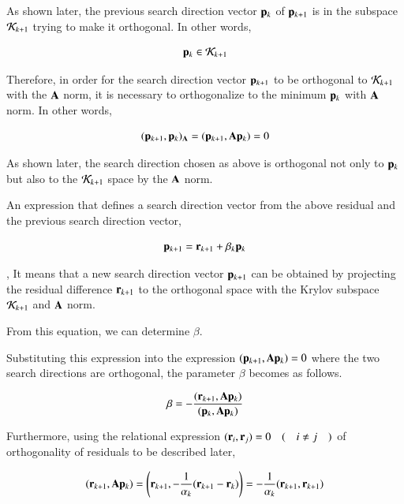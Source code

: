 As shown later, the previous search direction vector $\mathbf{p}_k$ of $\mathbf{p}_{k+1}$ is in the subspace ${\cal K}_{k+1}$ trying to make it orthogonal. In other words,

\begin{equation}
\mathbf{p}_k\in{\cal K}_{k+1}
\end{equation}


Therefore, in order for the search direction vector $\mathbf{p}_{k+1}$ to be orthogonal to ${\cal K}_{k+1}$ with the $\mathbf{A}$ norm, it is necessary to orthogonalize to the minimum $\mathbf{p}_k$ with $\mathbf{A}$ norm. In other words,

\begin {screen}
\begin{equation}
(\mathbf{p}_{k+1},\mathbf{p}_k)_{\mathbf{A}}=(\mathbf{p}_{k+1},\mathbf{A}\mathbf{p}_k)=0
\end{equation}
\end {screen}

As shown later, the search direction chosen as above is orthogonal not only to $\mathbf{p}_{k}$ but also to the ${\cal K}_{k+1}$ space by the $\mathbf{A}$ norm.

An expression that defines a search direction vector from the above residual and the previous search direction vector,


\begin{equation}
\mathbf{p}_{k+1}=\mathbf{r}_{k+1}+\beta_k\mathbf{p}_k
\end{equation}


, It means that a new search direction vector $\mathbf{p}_{k+1}$ can be obtained by projecting the residual difference $\mathbf{r}_{k+1}$ to the orthogonal space with the Krylov subspace ${\cal K}_{k+1}$ and $\mathbf{A}$ norm.

From this equation, we can determine $\beta$.

Substituting this expression into the expression $(\mathbf{p}_{k+1},\mathbf{A}\mathbf{p}_k)=0$ where the two search directions are orthogonal, the parameter $\beta$ becomes as follows. ~

\begin{equation}
\beta=-\frac{(\mathbf{r}_{k+1},\mathbf{A}\mathbf{p}_k)}{(\mathbf{p}_k,\mathbf{A}\mathbf{p}_k)}
\end{equation}



Furthermore, using the relational expression $(\mathbf{r}_i,\mathbf{r}_j)=0 \quad (\quad i\ne j\quad)$ of orthogonality of residuals to be described later,

\begin{equation}
(\mathbf{r}_{k+1},\mathbf{A}\mathbf{p}_k)=\left(\mathbf{r}_{k+1},-\frac{1}{\alpha_k}(\mathbf{r}_{k+1}-\mathbf{r}_k)\right)=-\frac{1}{\alpha_k}(\mathbf{r}_{k+1},\mathbf{r}_{k+1})
\end{equation}

